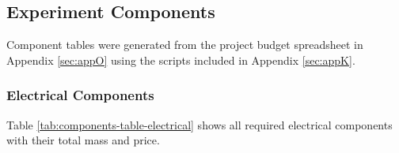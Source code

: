 \documentclass[a4paper,12pt,oneside]{article}
\begin{document}
\raggedbottom
\begin{landscape}
\subsection{Experiment Components} \label{components}
\label{sec:experiment-components}

Component tables were generated from the project budget spreadsheet in Appendix \ref{sec:appO} using the scripts included in Appendix \ref{sec:appK}. 

\subsubsection{Electrical Components}

Table \ref{tab:components-table-electrical} shows all required electrical components with their total mass and price.\\


\end{landscape}
\end{document}
